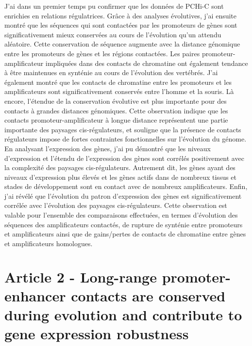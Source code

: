 J’ai dans un premier temps pu confirmer que les données de \acrshort{PCHi-C} sont enrichies en relations régulatrices. Grâce à des analyses évolutives, j’ai ensuite montré que les séquences qui sont contactées par les promoteurs de gènes sont significativement mieux conservées au cours de l'évolution qu’un attendu aléatoire. Cette conservation de séquence augmente avec la distance génomique entre les promoteurs de gènes et les régions contactées. Les paires promoteur-\gls{amplificateur} impliquées dans des contacts de chromatine ont également tendance à être maintenues en synténie au cours de l'évolution des vertébrés. J’ai également montré que les contacts de chromatine entre les promoteurs et les \glspl{amplificateur} sont significativement conservés entre l'homme et la souris. Là encore, l'étendue de la conservation évolutive est plus importante pour des contacts à grandes distances génomiques. Cette observation indique que les contacts promoteur-\gls{amplificateur} à longue distance représentent une partie importante des paysages \gls{cis}-régulateurs, et souligne que la présence de contacts régulateurs impose de fortes contraintes fonctionnelles sur l'évolution du génome. En analysant l’expression des gènes, j’ai pu démontré que les niveaux d'expression et l’étendu de l’expression des gènes sont corrélés positivement avec la complexité des paysages \gls{cis}-régulateurs. Autrement dit, les gènes ayant des niveaux d'expression plus élevés et les gènes actifs dans de nombreux tissus et stades de développement sont en contact avec de nombreux amplificateurs. Enfin, j’ai révélé que l’évolution du patron d’expression des gènes est significativement corrélée avec l'évolution des paysages \gls{cis}-régulateurs. Cette observation est valable pour l’ensemble des comparaisons effectuées, en termes d’évolution des séquences des \glspl{amplificateur} contactés, de rupture de synténie entre promoteurs et \glspl{amplificateur} ainsi que de gains/pertes de contacts de chromatine entre gènes et \glspl{amplificateur} homologues.

\chapter{Article 2 - Long-range promoter-enhancer contacts are conserved during evolution and contribute to gene expression robustness}
\label{chap:chap3}
